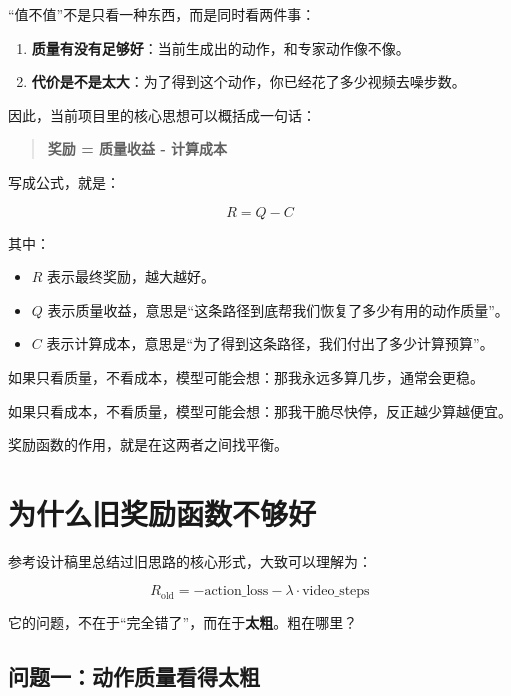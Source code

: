 \documentclass[12pt]{ctexart}
\begin{document}
“值不值”不是只看一种东西，而是同时看两件事：

\begin{enumerate}
    \item \textbf{质量有没有足够好}：当前生成出的动作，和专家动作像不像。
    \item \textbf{代价是不是太大}：为了得到这个动作，你已经花了多少视频去噪步数。
\end{enumerate}

因此，当前项目里的核心思想可以概括成一句话：

\begin{quote}
    \textbf{奖励 = 质量收益 - 计算成本}
\end{quote}

写成公式，就是：

\begin{equation}
    R = Q - C
\end{equation}

其中：

\begin{itemize}
    \item $R$ 表示最终奖励，越大越好。
    \item $Q$ 表示质量收益，意思是“这条路径到底帮我们恢复了多少有用的动作质量”。
    \item $C$ 表示计算成本，意思是“为了得到这条路径，我们付出了多少计算预算”。
\end{itemize}

如果只看质量，不看成本，模型可能会想：那我永远多算几步，通常会更稳。

如果只看成本，不看质量，模型可能会想：那我干脆尽快停，反正越少算越便宜。

奖励函数的作用，就是在这两者之间找平衡。

\section{为什么旧奖励函数不够好}

参考设计稿里总结过旧思路的核心形式，大致可以理解为：

\begin{equation}
    R_{\text{old}} = -\text{action\_loss} - \lambda \cdot \text{video\_steps}
\end{equation}

它的问题，不在于“完全错了”，而在于\textbf{太粗}。粗在哪里？

\subsection{问题一：动作质量看得太粗}
\end{document}
